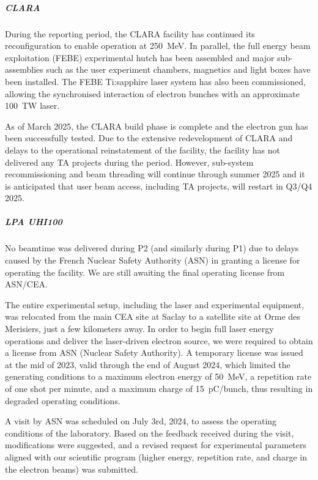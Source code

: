 {%

\subparagraph{CLARA}
 
During the reporting period, the CLARA facility has continued its reconfiguration to enable operation at \SI{250}{MeV}. 
In parallel, the full energy beam exploitation (FEBE) experimental hutch has been assembled and major sub-assemblies such as the user experiment chambers, magnetics and light boxes have been installed. The FEBE Ti:sapphire laser system has also been commissioned, allowing the synchronised interaction of electron bunches with an approximate \SI{100}{TW} laser. 

As of March 2025, the CLARA build phase is complete and the electron gun has been successfully tested. Due to the extensive redevelopment of CLARA and delays to the operational reinstatement of the facility, the facility has not delivered any TA projects during the period. However, sub-system recommissioning and beam threading will continue through summer 2025 and it is anticipated that user beam access, including TA projects, will restart in Q3/Q4 2025.


\subparagraph{LPA UHI100} 

No beamtime was delivered during P2 (and similarly during P1) due to delays caused by the French Nuclear Safety Authority (ASN) in granting a license for operating the facility. We are still awaiting the final operating license from ASN/CEA.

The entire experimental setup, including the laser and experimental equipment, was relocated from the main CEA site at Saclay to a satellite site at Orme des Merisiers, just a few kilometers away. In order to begin full laser energy operations and deliver the laser-driven electron source, we were required to obtain a license from ASN (Nuclear Safety Authority). A temporary license was issued at the mid of 2023, valid through the end of August 2024, which limited the generating conditions to a maximum electron energy of \SI{50}{MeV}, a repetition rate of one shot per minute, and a maximum charge of \SI{15}{\pico C/bunch}, thus resulting in degraded operating conditions.

A visit by ASN was scheduled on July 3rd, 2024, to assess the operating conditions of the laboratory. Based on the feedback received during the visit, modifications were suggested, and a revised request for experimental parameters aligned with our scientific program (higher energy, repetition rate, and charge in the electron beams) was submitted.

}
